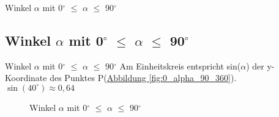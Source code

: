 \documentclass{standalone}
\begin{document}
\begin{frame}
  \begin{center}
    Winkel $\alpha$ mit 0$^\circ$  $\leq$ $\alpha$ $\leq$ 90$^\circ$
  \end{center}
  \subsection{Winkel $\alpha$ mit 0$^\circ$  $\leq$ $\alpha$ $\leq$ 90$^\circ$}
\end{frame}

\begin{frame}{Winkel $\alpha$ mit 0$^\circ$  $\leq$ $\alpha$ $\leq$ 90$^\circ$}
  Am Einheitskreis entspricht sin($\alpha$) der y-Koordinate des Punktes P(\hyperref[fig:0_alpha_90_360]{Abbildung \autoref{fig:0_alpha_90_360}}).\\
  \textbf{$\sin(40^\circ ) \approx 0,64$}

  \begin{figure}[hb!]
    \center
    \def\svgwidth{150px}
    
    \caption{Winkel $\alpha$ mit 0$^\circ$  $\leq$ $\alpha$ $\leq$ 90$^\circ$ }
    \label{fig:0_alpha_90_360}
  \end{figure}
\end{frame}
\end{document}
